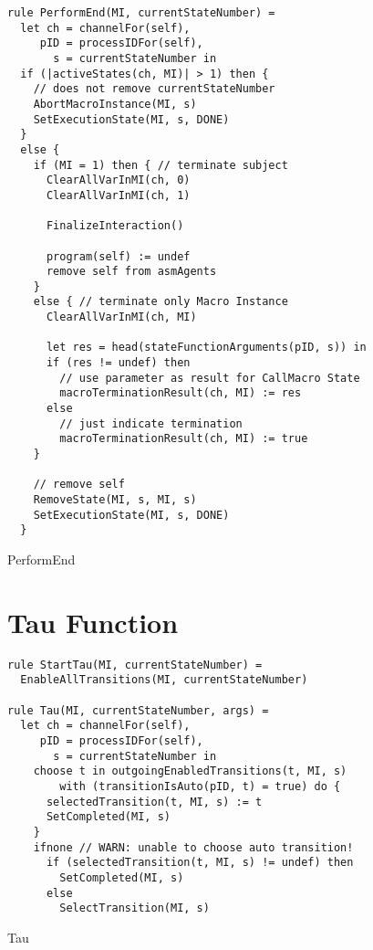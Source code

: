 \begin{listing}[H]
\begin{verbatim}
rule PerformEnd(MI, currentStateNumber) =
  let ch = channelFor(self),
     pID = processIDFor(self),
       s = currentStateNumber in
  if (|activeStates(ch, MI)| > 1) then {
    // does not remove currentStateNumber
    AbortMacroInstance(MI, s)
    SetExecutionState(MI, s, DONE)
  }
  else {
    if (MI = 1) then { // terminate subject
      ClearAllVarInMI(ch, 0)
      ClearAllVarInMI(ch, 1)

      FinalizeInteraction()

      program(self) := undef
      remove self from asmAgents
    }
    else { // terminate only Macro Instance
      ClearAllVarInMI(ch, MI)

      let res = head(stateFunctionArguments(pID, s)) in
      if (res != undef) then
        // use parameter as result for CallMacro State
        macroTerminationResult(ch, MI) := res
      else
        // just indicate termination
        macroTerminationResult(ch, MI) := true
    }

    // remove self
    RemoveState(MI, s, MI, s)
    SetExecutionState(MI, s, DONE)
  }
\end{verbatim}
\caption{PerformEnd}
\label{lst:asm:PerformEnd}
\end{listing}



\section{Tau Function}



\begin{listing}[H]
\begin{verbatim}
rule StartTau(MI, currentStateNumber) =
  EnableAllTransitions(MI, currentStateNumber)

rule Tau(MI, currentStateNumber, args) =
  let ch = channelFor(self),
     pID = processIDFor(self),
       s = currentStateNumber in
    choose t in outgoingEnabledTransitions(t, MI, s)
        with (transitionIsAuto(pID, t) = true) do {
      selectedTransition(t, MI, s) := t
      SetCompleted(MI, s)
    }
    ifnone // WARN: unable to choose auto transition!
      if (selectedTransition(t, MI, s) != undef) then
        SetCompleted(MI, s)
      else
        SelectTransition(MI, s)
\end{verbatim}
\caption{Tau}
\label{lst:asm:Tau}
\end{listing}



